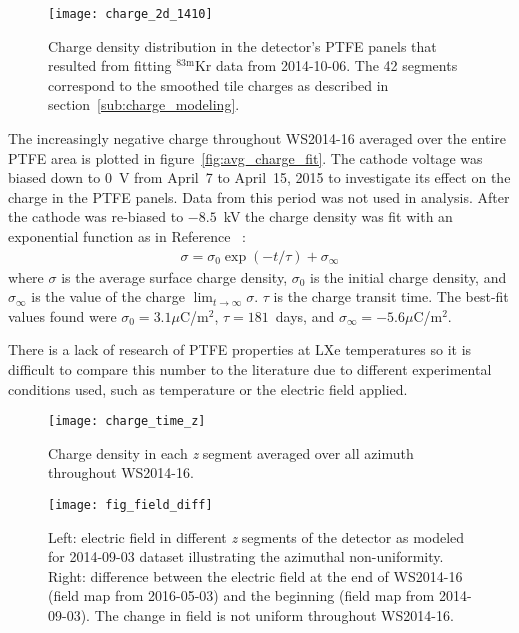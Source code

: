\documentclass[11pt,a4paper]{article}
\newcommand{\isot}[2]{$^{\textrm{#2}}$#1 }
\newcommand{\krm}{\isot{Kr}{83m}}
\begin{document}
\begin{figure}[ht!]
\begin{center}
\texttt{[image: charge\_2d\_1410]}
\caption{Charge density distribution in the detector's PTFE panels that resulted from fitting \krm data from 2014-10-06. The 42 segments correspond to the smoothed tile charges as described in section~\ref{sub:charge_modeling}.}
\label{fig:charge_2d_1410}
\end{center} 
\end{figure}

The increasingly negative charge throughout WS2014-16 averaged over the entire PTFE area is plotted in figure~\ref{fig:avg_charge_fit}. The cathode voltage was biased down to 0~V from April~7 to April~15, 2015 to investigate its effect on the charge in the PTFE panels. Data from this period was not used in analysis. After the cathode was re-biased to $-8.5$~kV the charge density was fit with an exponential function as in Reference ~\cite{mellinger2004charge}:
\begin{eqnarray}
\sigma=\sigma_{0}\exp(-t/\tau)+\sigma_\infty\label{eq:charge_fit}
\end{eqnarray}
where $\sigma$ is the average surface charge density, $\sigma_{0}$ is the initial charge density, and $\sigma_\infty$ is the value of the charge $\lim_{t\to\infty}\sigma$. $\tau$ is the charge transit time. The best-fit values found were $\sigma_{0}=3.1\mu$C/m$^2$, $\tau=181$~days, and $\sigma_\infty=-5.6\mu$C/m$^2$.

There is a lack of research of PTFE properties at LXe temperatures so it is difficult to compare this number to the literature due to different experimental conditions used, such as temperature or the electric field applied. 

\begin{figure}[h!]
\begin{center}
\texttt{[image: charge\_time\_z]}
\caption{Charge density in each \textit{z} segment averaged over all azimuth throughout WS2014-16.}
\label{fig:charge_time_z}
\end{center} 
\end{figure}

\begin{figure}[h!]
\begin{center}
\texttt{[image: fig\_field\_diff]}
\caption{Left: electric field in different \textit{z} segments of the detector as modeled for 2014-09-03 dataset illustrating the azimuthal non-uniformity. Right: difference between the electric field at the end of WS2014-16 (field map from 2016-05-03) and the beginning (field map from 2014-09-03). The change in field is not uniform throughout WS2014-16.}
\label{fig:field_diff}
\end{center} 
\end{figure}
\end{document}
